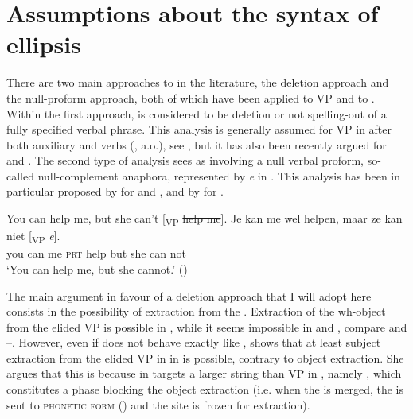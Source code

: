 \documentclass[output=paper,colorlinks,citecolor=brown,]{langsci/langscibook}
\begin{document}
\section{Assumptions about the syntax of ellipsis}\label{sec:2}
\largerpage
There are two main approaches to  in the literature, the deletion approach and the null-proform approach, both of which have been applied to VP  and to . Within the first approach,  is considered to be deletion or not spelling-out of a fully specified verbal phrase. This analysis is generally assumed for VP  in  after both auxiliary and  verbs (\citealt{ross1967constraints,Sag1976,Hankamer-Sag1976,Merchant2001,Merchant2008a}, a.o.), see , but it has also been recently argued for  \citep{Aelbrecht2008,Aelbrecht2010} and  \citep{Dagnac2010}. The second type of analysis sees  as involving a null verbal proform, so-called null-complement anaphora, represented by \textit{e} in . This analysis has been in particular proposed by \cite{Depiante2001} for  and , and by \cite{Lobeck1995} for .

\begin{exe}
\ex
\begin{xlist}
\ex\label{5a} You can help me, but she can't [\textsubscript{VP} \sout{help me}].
\ex \label{5b}
\gll Je    kan me wel  helpen, maar ze kan niet [\textsubscript{VP} \textit{e}].  \\
 you can me \textsc{prt}  help  but  she can not \\
\glt `You can help me, but she cannot.' \hfill ()
\end{xlist}
\end{exe}

\noindent The main argument in favour of a deletion approach that I will adopt here consists in the possibility of extraction from the . Extraction of the wh-object from the elided VP is possible in , while it seems impossible in  and , compare  and --. However, even if  does not behave exactly like , \cite{Aelbrecht2008,Aelbrecht2010} shows that at least subject extraction from the elided VP in  in  is possible, contrary to object extraction. She argues that this is because  in  targets a larger string than VP  in , namely , which constitutes a phase blocking the object extraction (i.e. when the  is merged, the  is sent to \textsc{phonetic form} () and the site is frozen for extraction).
\end{document}
